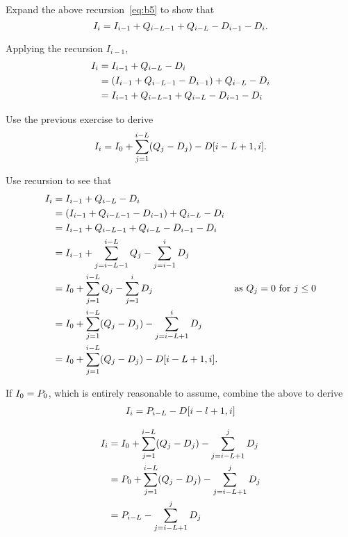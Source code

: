 \begin{exercise}
Expand the above recursion~\eqref{eq:b5} to show that 
\begin{equation*}
  I_{i} = I_{i-1}+Q_{i-L-1} + Q_{i-L} - D_{i-1} - D_i.
\end{equation*}
\begin{solution}
Applying the recursion $I_{i-1}$, 
\begin{align*}
  I_{i} 
&= I_{i-1} + Q_{i-L} - D_i \\
&= (I_{i-1}+Q_{i-L-1} - D_{i-1}) + Q_{i-L} - D_i \\
&= I_{i-1}+Q_{i-L-1} + Q_{i-L} - D_{i-1} - D_i \\
\end{align*}
  \end{solution}
\end{exercise}

\begin{exercise}
  Use the previous exercise to derive
  \begin{equation}
    I_i= I_0 + \sum_{j=1}^{i-L} (Q_j-D_j) - D[i-L+1, i].
  \end{equation}
  \begin{solution}
Use recursion to see that
\begin{align*}
  I_{i} 
&= I_{i-1} + Q_{i-L} - D_i \\
&= (I_{i-1}+Q_{i-L-1} - D_{i-1}) + Q_{i-L} - D_i \\
&= I_{i-1}+Q_{i-L-1} + Q_{i-L} - D_{i-1} - D_i \\
&= I_{i-1}+\sum_{j=i-L-1}^{i-L} Q_{j} - \sum_{j=i-1}^i D_{j} \\
&= I_{0}+\sum_{j=1}^{i-L} Q_{j} - \sum_{j=1}^i D_{j} &\text{as } Q_j = 0\text{ for } j\leq 0\\
&= I_{0}+\sum_{j=1}^{i-L} (Q_{j}-D_j) - \sum_{j=i-L+1}^i D_{j}\\
&= I_{0}+\sum_{j=1}^{i-L} (Q_{j}-D_j) - D[i-L+1, i].
\end{align*}
  \end{solution}
\end{exercise}


\begin{exercise}
If $I_0 = P_0$, which is entirely reasonable to assume, combine the above to derive
\begin{align}\label{eq:15}
  I_i = P_{i-L} - D[i-l+1, i]
\end{align}
\begin{solution}
  \begin{align*}
    I_i
&= I_0 + \sum_{j=1}^{i-L} (Q_j-D_j) - \sum_{j=i-L+1}^j D_j \\
&= P_0 + \sum_{j=1}^{i-L} (Q_j-D_j) - \sum_{j=i-L+1}^j D_j \\
&= P_{i-L} - \sum_{j=i-L+1}^j D_j \\
  \end{align*}
\end{solution}
\end{exercise}

